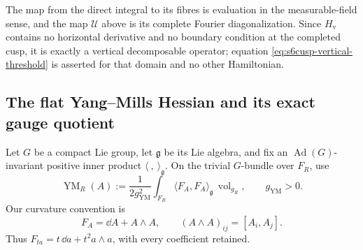 The map from the direct integral to its fibres is evaluation in the
measurable-field sense, and the map \(\mathcal U\) above is its complete
Fourier diagonalization.  Since \(H_{\mathrm v}\) contains no horizontal
derivative and no boundary condition at the completed cusp, it is exactly a
vertical decomposable operator; equation
\eqref{eq:s6cusp-vertical-threshold} is asserted for that domain and no
other Hamiltonian.

\subsection{The flat Yang--Mills Hessian and its exact gauge quotient}

Let \(G\) be a compact Lie group, let \(\mathfrak g\) be its Lie algebra,
and fix an \(\operatorname{Ad}(G)\)-invariant positive inner product
\(\langle\ ,\ \rangle_{\mathfrak g}\).  On the trivial \(G\)-bundle over
\(F_R\), use
\begin{equation}\label{eq:s6cusp-yang-mills-action}
 \operatorname{YM}_R(A):=
 \frac{1}{2g_{\mathrm{YM}}^2}
 \int_{F_R}\langle F_A,F_A\rangle_{\mathfrak g}\,
 \operatorname{vol}_{g_R},
 \qquad g_{\mathrm{YM}}>0.
\end{equation}
Our curvature convention is
\[
 F_A=\dd A+A\wedge A,\qquad
 (A\wedge A)_{ij}=[A_i,A_j].
\]
Thus \(F_{ta}=t\,\dd a+t^2a\wedge a\), with every coefficient retained.

